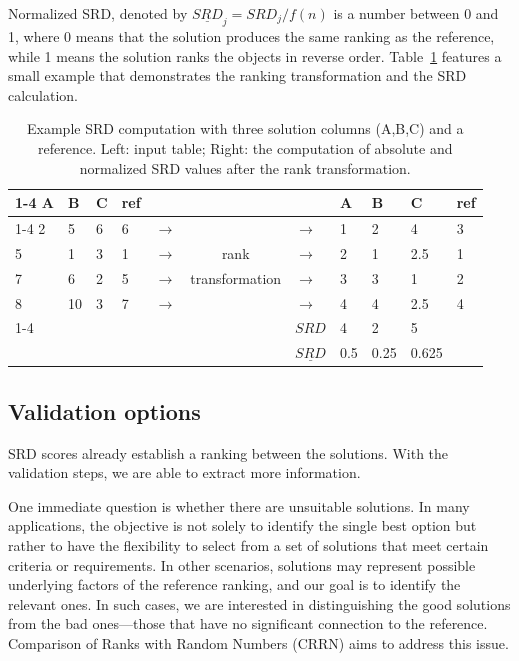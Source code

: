 Normalized SRD, denoted by $\underline{SRD}_j= SRD_j/f(n)$ is a number between 0 and 1, where 0 means that the solution produces the same ranking as the reference, while 1 means the solution ranks the objects in reverse order. Table~\ref{tab:tox_example} features a small example that demonstrates the ranking transformation and the SRD calculation.

\begin{table}[]
\centering
\begin{tabular}{lllllclllll}
\cline{1-4}\cline{8-11}
A & B  & C & ref &       &      &         & A   & B    & C     & ref \\
\cline{1-4}\cline{8-11}
2 & 5  & 6 & 6   & $\longrightarrow$ &  &  $\longrightarrow$     & 1   & 2    & 4     & 3   \\
5 & 1  & 3 & 1   & $\longrightarrow$ & rank & $\longrightarrow$     & 2   & 1    & 2.5   & 1   \\
7 & 6  & 2 & 5   & $\longrightarrow$ &  transformation& $\longrightarrow$     & 3   & 3    & 1     & 2   \\
8 & 10 & 3 & 7   & $\longrightarrow$ &  &   $\longrightarrow$    & 4   & 4    & 2.5   & 4   \\
\cline{1-4}\cline{8-11}
  &    &   &     &        &       & $SRD$     & 4   & 2    & 5     &     \\
  &    &   &     &        &       & $\underline{SRD}$ & 0.5 & 0.25 & 0.625 &
\end{tabular}
\caption{Example SRD computation with three solution columns (A,B,C) and a reference. Left: input table; Right: the computation of absolute and normalized SRD values after the rank transformation.}\label{tab:tox_example}
\end{table}

\subsection{Validation options}

SRD scores already establish a ranking between the solutions. With the validation steps, we are able to extract more information.

One immediate question is whether there are unsuitable solutions. In many applications, the objective is not solely to identify the single best option but rather to have the flexibility to select from a set of solutions that meet certain criteria or requirements. In other scenarios, solutions may represent possible underlying factors of the reference ranking, and our goal is to identify the relevant ones. In such cases, we are interested in distinguishing the good solutions from the bad ones—those that have no significant connection to the reference. Comparison of Ranks with Random Numbers (CRRN) aims to address this issue.

